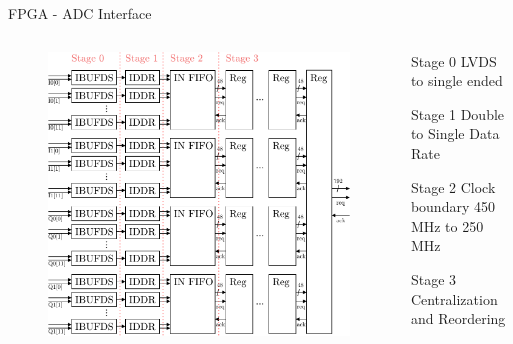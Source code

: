 \documentclass{beamer}
\begin{document}
\begin{frame}{FPGA - ADC Interface}
  \begin{columns}[T]
    \begin{column}{.7\textwidth}
      \begin{figure}
        \centering
        \includegraphics[width=\textwidth]{figures/fpga_adc}
      \end{figure}
    \end{column}
    \begin{column}{.3\textwidth}
      \begin{block}{Stage 0}
        LVDS to single ended
      \end{block}
      \begin{block}{Stage 1}
        Double to Single Data Rate
      \end{block}
      \begin{block}{Stage 2}
        Clock boundary 450 MHz to 250 MHz
      \end{block}
      \begin{block}{Stage 3}
        Centralization and Reordering
      \end{block}
    \end{column}
  \end{columns}
\end{frame}
\end{document}
